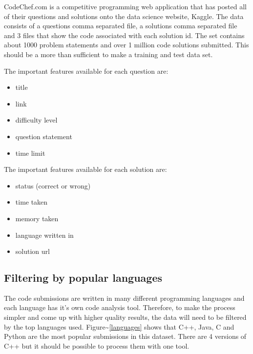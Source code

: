 \documentclass{article}
\begin{document}
CodeChef.com is a competitive programming web application that has
posted all of their questions and solutions onto the data science
website, Kaggle. The data consists of a questions comma separated file,
a solutions comma separated file and 3 files that show the code
associated with each solution id. The set contains about 1000 problem
statements and over 1 million code solutions submitted. This should be a
more than sufficient to make a training and test data set.

The important features available for each question are:

\begin{itemize}
\tightlist
\item
  title
\item
  link
\item
  difficulty level
\item
  question statement
\item
  time limit
\end{itemize}

The important features available for each solution are:

\begin{itemize}
\tightlist
\item
  status (correct or wrong)
\item
  time taken
\item
  memory taken
\item
  language written in
\item
  solution url
\end{itemize}

\subsection{Filtering by popular
languages}\label{filtering-by-popular-languages}

The code submissions are written in many different programming languages
and each language has it's own code analysis tool. Therefore, to make
the process simpler and come up with higher quality results, the data
will need to be filtered by the top languages used.
Figure\textasciitilde{}\ref{languages} shows that C++, Java, C and
Python are the most popular submissions in this dataset. There are 4
versions of C++ but it should be possible to process them with one tool.
\end{document}
